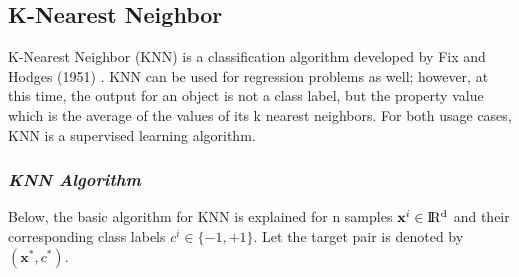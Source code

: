 \subsection{K-Nearest Neighbor}

K-Nearest Neighbor (KNN) is a classification algorithm developed by Fix and Hodges (1951) \cite{knn_pdf}. KNN can be used for regression problems as well; however, at this time, the output for an object is not a class label, but the property value which is the average of the values of its k nearest neighbors. For both usage cases, KNN is a supervised learning algorithm.

\subsubsection*{\textit{KNN Algorithm}}

Below, the basic algorithm for KNN is explained for n samples $\textbf{x}^{i} \in \rm I\!R^{d}$ and their corresponding class labels $c^{i} \in \{-1, +1\}$. Let the target pair is denoted by $(\textbf{x}^{*}, c^{*})$.

